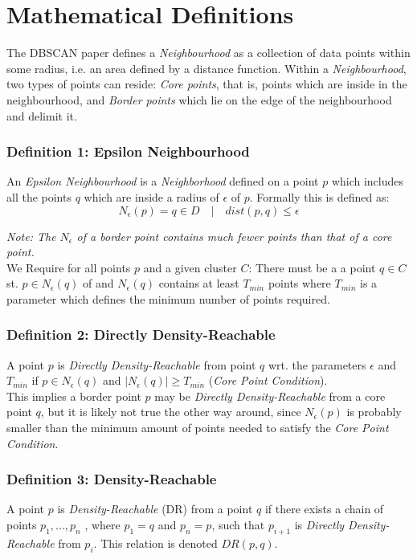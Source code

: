 \section{Mathematical Definitions}

The DBSCAN paper defines a \textit{Neighbourhood} as a collection of data points within some radius, i.e. an area defined by a distance function. Within a \textit{Neighbourhood}, two types of points can reside: \textit{Core points}, that is, points which are inside in the neighbourhood, and \textit{Border points } which lie on the edge of the neighbourhood and delimit it. 

\subsubsection*{Definition 1: Epsilon Neighbourhood}
An \textit{Epsilon Neighbourhood} is a \textit{Neighborhood} defined on a point $p$ which includes all the points $q$ which are inside a radius of $\epsilon$ of $p$. Formally this is defined as:\\

$$N_{\epsilon} (p) = q \in D \quad|\quad dist(p,q) \leq \epsilon$$

\textit{Note: The $N_{\epsilon}$ of a border point contains much fewer points than that of a core point. }\\

We Require for all points $p$ and a given cluster $C$: There must be a a point $q \in C$ st. $p \in N_{\epsilon}(q)$ of and $N_{\epsilon}(q)$ contains at least $T_{min}$ points where $T_{min}$ is a parameter which defines the minimum number of points required.

\subsubsection*{Definition 2: Directly Density-Reachable}
A point $p$ is \textit{Directly Density-Reachable} from point $q$ wrt. the parameters $\epsilon$ and $T_{min}$ if $p \in N_{\epsilon}(q)$ and $|N_{\epsilon}(q)| \geq T_{min}$ (\textit{Core Point Condition}).\\

This implies a border point $p$ may be \textit{Directly Density-Reachable} from a core point $q$, but it is likely not true the other way around, since $N_{\epsilon}(p)$ is probably smaller than the minimum amount of points needed to satisfy the \textit{Core Point Condition}.

\subsubsection*{Definition 3: Density-Reachable}
A point $p$ is \textit{Density-Reachable} (DR) from a point $q$ if
there exists a chain of points $p_1, ..., p_n$ , where $p_1 = q$ and $p_n = p$, such that $p_{i+1}$ is \textit{Directly Density-Reachable} from $p_i$.
This relation is denoted $DR(p,q)$.\\

